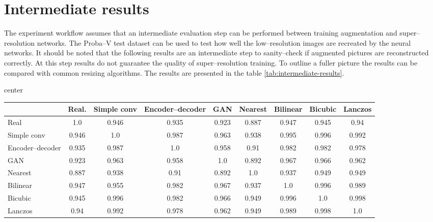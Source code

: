 \section{Intermediate results}
The experiment workflow assumes that an intermediate evaluation step can be performed between training augmentation and super--resolution networks.
The Proba--V test dataset can be used to test how well the low--resolution images are recreated by the neural networks.
It should be noted that the following results are an intermediate step to sanity--check if augmented pictures are reconstructed correctly.
At this step results do not guarantee the quality of super--resolution training. 
To outline a fuller picture the results can be compared with common resizing algorithms.
The results are presented in the table \ref{tab:intermediate-results}.
\begin{sidewaystable}
\centering
\caption{Intermediate results of evaluation on Proba--V test dataset (SSIM metric)}
\label{tab:intermediate-results}
\begin{adjustbox}{center}
\begin{tabular}{lcccccccc}
\toprule
                 & Real.       & Simple conv & Encoder--decoder & GAN & Nearest & Bilinear & Bicubic & Lanczos \\
\midrule
Real             &      1.0       &    0.946     & 0.935 &   0.923     &   0.887       & 0.947 & 0.945 & 0.94 \\
Simple conv      & 0.946 & 1.0 &   0.987  &  0.963  & 0.938 & 0.995 & 0.996 & 0.992 \\
Encoder--decoder & 0.935 & 0.987 &  1.0   &     0.958  & 0.91 & 0.982 & 0.982 & 0.978  \\
GAN              &   0.923          &  0.963             &   0.958  & 1.0 & 0.892 &     0.967    & 0.966 & 0.962 \\
Nearest          & 0.887 & 0.938 &   0.91  & 0.892 & 1.0 & 0.937 & 0.949 & 0.949 \\
Bilinear         & 0.947 & 0.955 &    0.982 & 0.967 & 0.937 & 1.0 & 0.996    &  0.989 \\
Bicubic          & 0.945 & 0.996 &  0.982   & 0.966 & 0.949 & 0.996 &   1.0  & 0.998 \\
Lanczos          & 0.94& 0.992 &    0.978 & 0.962 & 0.949 & 0.989       & 0.998 & 1.0 \\
\bottomrule        
\end{tabular}
\end{adjustbox}
\end{sidewaystable}
